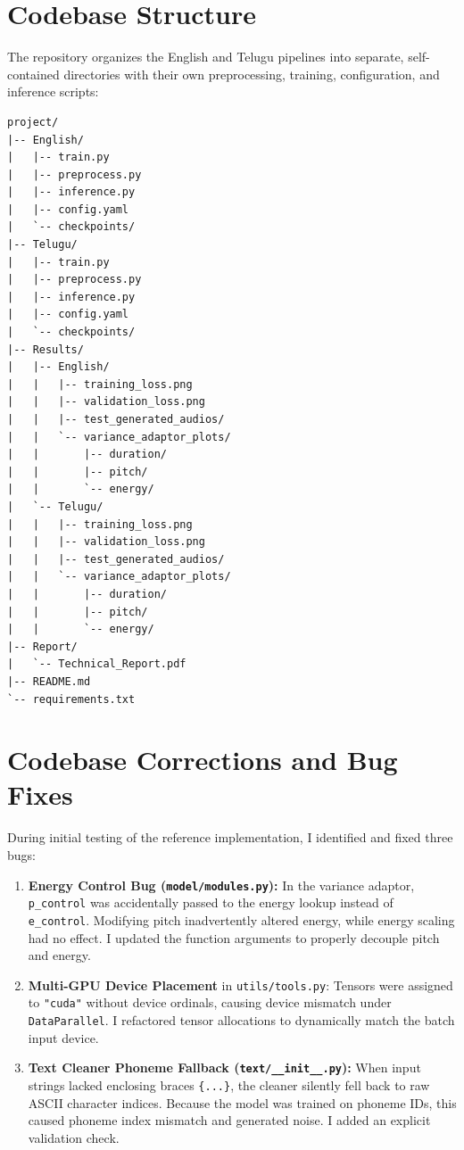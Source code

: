\documentclass[11pt,a4paper]{report}
\begin{document}
\section{Codebase Structure}
The repository organizes the English and Telugu pipelines into separate, self-contained directories with their own preprocessing, training, configuration, and inference scripts:

\begin{lstlisting}
project/
|-- English/
|   |-- train.py
|   |-- preprocess.py
|   |-- inference.py
|   |-- config.yaml
|   `-- checkpoints/
|-- Telugu/
|   |-- train.py
|   |-- preprocess.py
|   |-- inference.py
|   |-- config.yaml
|   `-- checkpoints/
|-- Results/
|   |-- English/
|   |   |-- training_loss.png
|   |   |-- validation_loss.png
|   |   |-- test_generated_audios/
|   |   `-- variance_adaptor_plots/
|   |       |-- duration/
|   |       |-- pitch/
|   |       `-- energy/
|   `-- Telugu/
|   |   |-- training_loss.png
|   |   |-- validation_loss.png
|   |   |-- test_generated_audios/
|   |   `-- variance_adaptor_plots/
|   |       |-- duration/
|   |       |-- pitch/
|   |       `-- energy/
|-- Report/
|   `-- Technical_Report.pdf
|-- README.md
`-- requirements.txt
\end{lstlisting}

\section{Codebase Corrections and Bug Fixes}
During initial testing of the reference implementation, I identified and fixed three bugs:
\begin{enumerate}
    \item \textbf{Energy Control Bug (\texttt{model/modules.py}):} In the variance adaptor, \texttt{p\_control} was accidentally passed to the energy lookup instead of \texttt{e\_control}. Modifying pitch inadvertently altered energy, while energy scaling had no effect. I updated the function arguments to properly decouple pitch and energy.
    \item \textbf{Multi-GPU Device Placement} in \texttt{utils/tools.py}: Tensors were assigned to \texttt{"cuda"} without device ordinals, causing device mismatch under \texttt{DataParallel}. I refactored tensor allocations to dynamically match the batch input device.
    \item \textbf{Text Cleaner Phoneme Fallback (\texttt{text/\_\_init\_\_.py}):} When input strings lacked enclosing braces \texttt{\{...\}}, the cleaner silently fell back to raw ASCII character indices. Because the model was trained on phoneme IDs, this caused phoneme index mismatch and generated noise. I added an explicit validation check.
\end{enumerate}
\end{document}
